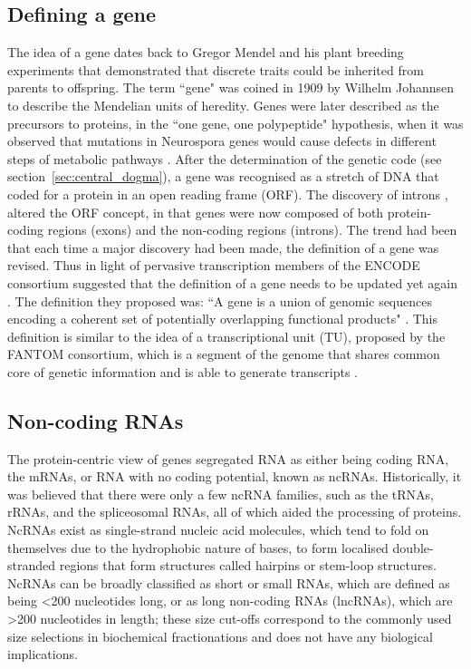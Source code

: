 \subsection{Defining a gene}

The idea of a gene dates back to Gregor Mendel and his plant breeding experiments that demonstrated that discrete traits could be inherited from parents to offspring. The term ``gene" was coined in 1909 by Wilhelm Johannsen to describe the Mendelian units of heredity. Genes were later described as the precursors to proteins, in the ``one gene, one polypeptide" hypothesis, when it was observed that mutations in Neurospora genes would cause defects in different steps of metabolic pathways  \citep{Beadle15111941}. After the determination of the genetic code (see section~\ref{sec:central_dogma}), a gene was recognised as a stretch of DNA that coded for a protein in an open reading frame (ORF). The discovery of introns \citep{pmid890740,pmid922889}, altered the ORF concept, in that genes were now composed of both protein-coding regions (exons) and the non-coding regions (introns). The trend had been that each time a major discovery had been made, the definition of a gene was revised. Thus in light of pervasive transcription members of the ENCODE consortium suggested that the definition of a gene needs to be updated yet again \citep{pmid17567988}. The definition they proposed was: ``A gene is a union of genomic sequences encoding a coherent set of potentially overlapping functional products" \citep{pmid17567988}. This definition is similar to the idea of a transcriptional unit (TU), proposed by the FANTOM consortium, which is a segment of the genome that shares common core of genetic information and is able to generate transcripts \citep{pmid12466851}.

\subsection{Non-coding RNAs}

The protein-centric view of genes segregated RNA as either being coding RNA, the mRNAs, or RNA with no coding potential, known as ncRNAs. Historically, it was believed that there were only a few ncRNA families, such as the tRNAs, rRNAs, and the spliceosomal RNAs, all of which aided the processing of proteins. NcRNAs exist as single-strand nucleic acid molecules, which tend to fold on themselves due to the hydrophobic nature of bases, to form localised double-stranded regions that form structures called hairpins or stem-loop structures. NcRNAs can be broadly classified as short or small RNAs, which are defined as being \textless200 nucleotides long, or as long non-coding RNAs (lncRNAs), which are \textgreater200 nucleotides in length; these size cut-offs correspond to the commonly used size selections in biochemical fractionations and does not have any biological implications.

